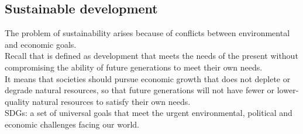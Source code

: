 \subsection{Sustainable development}
The problem of sustainability arises because of conflicts between environmental and economic goals.\\
Recall that  is defined as development that meets the needs of the present without compromising the ability of future generations to meet their own needs.\\
It means that societies should pursue economic growth that does not deplete or degrade natural resources, so that future generations will not have fewer or lower-quality natural resources to satisfy their own needs.\\
SDGs: a set of universal goals that meet the urgent environmental, political and economic challenges facing our world.
